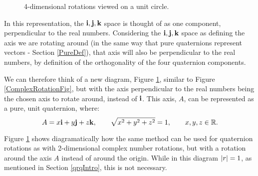 \documentclass[10pt]{article}
\begin{document}
\begin{figure}[ht]
    \centering
    \caption{4-dimensional rotations viewed on a unit circle.}
    \label{4DRotationsLike2DFig}
\end{figure}

In this representation, the $\vb{i,j,k}$ space is thought of as one component, perpendicular to the real numbers. Considering the $\vb{i,j,k}$ space as defining the axis we are rotating around (in the same way that pure quaternions represent vectors - Section \ref{PureDef}), that axis will also be perpendicular to the real numbers, by definition of the orthogonality of the four quaternion components.

We can therefore think of a new diagram, Figure \ref{4DRotationsLike2DFig}, similar to Figure \ref{ComplexRotationFig}, but with the axis perpendicular to the real numbers being the chosen axis to rotate around, instead of $\vb{i}$. This axis, $A$, can be represented as a pure, unit quaternion, where:
\begin{equation}
    A = x\vb{i} + y\vb{j} + z\vb{k}, \quad\quad
    \sqrt{x^2 + y^2 + z^2} = 1, \quad\quad
    x, y, z \in \mathbb{R}.
\end{equation}

Figure \ref{4DRotationsLike2DFig} shows diagramatically how the same method can be used for quaternion rotations as with 2-dimensional complex number rotations, but with a rotation around the axis $A$ instead of around the origin. While in this diagram $\abs{r} = 1$, as mentioned in Section \ref{qrqIntro}, this is not necessary.
\end{document}
